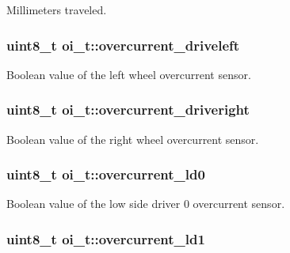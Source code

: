 Millimeters traveled. 

\hypertarget{structoi__t_aa1e11a40bb2181e9c7daf3f7c3a08f1d}{
\subsubsection[{overcurrent\_\-driveleft}]{\setlength{\rightskip}{0pt plus 5cm}uint8\_\-t {\bf oi\_\-t::overcurrent\_\-driveleft}}}
\label{structoi__t_aa1e11a40bb2181e9c7daf3f7c3a08f1d}


Boolean value of the left wheel overcurrent sensor. 

\hypertarget{structoi__t_ac6cb8e71fd22ed64e8774c9bdfed8eb6}{
\subsubsection[{overcurrent\_\-driveright}]{\setlength{\rightskip}{0pt plus 5cm}uint8\_\-t {\bf oi\_\-t::overcurrent\_\-driveright}}}
\label{structoi__t_ac6cb8e71fd22ed64e8774c9bdfed8eb6}


Boolean value of the right wheel overcurrent sensor. 

\hypertarget{structoi__t_a32f095a81cb31f60ae9e30e828605e38}{
\subsubsection[{overcurrent\_\-ld0}]{\setlength{\rightskip}{0pt plus 5cm}uint8\_\-t {\bf oi\_\-t::overcurrent\_\-ld0}}}
\label{structoi__t_a32f095a81cb31f60ae9e30e828605e38}


Boolean value of the low side driver 0 overcurrent sensor. 

\hypertarget{structoi__t_ad7d13aefa5a3616dab94f2aa538e934c}{
\subsubsection[{overcurrent\_\-ld1}]{\setlength{\rightskip}{0pt plus 5cm}uint8\_\-t {\bf oi\_\-t::overcurrent\_\-ld1}}}
\label{structoi__t_ad7d13aefa5a3616dab94f2aa538e934c}


